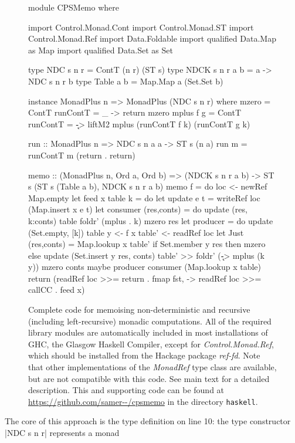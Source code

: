 \documentclass[a4paper,10pt]{article}
\begin{document}
\begin{figure}
\begin{haskell}
  module CPSMemo where

  import Control.Monad.Cont
  import Control.Monad.ST
  import Control.Monad.Ref
  import Data.Foldable
  import qualified Data.Map as Map
  import qualified Data.Set as Set

  type NDC s n r = ContT (n r) (ST s)
  type NDCK s n r a b = a -> NDC s n r b
  type Table a b = Map.Map a (Set.Set b)

  instance MonadPlus n => MonadPlus (NDC s n r) where
    mzero = ContT {runContT = \_ -> return mzero}
    mplus f g = ContT {runContT = \k -> liftM2 mplus (runContT f k) (runContT g k)}

  run :: MonadPlus n => NDC s n a a -> ST s (n a)
  run m = runContT m (return . return)

  memo :: (MonadPlus n, Ord a, Ord b) => 
           (NDCK s n r a b) -> ST s (ST s (Table a b), NDCK s n r a b)
  memo f = do
    loc <- newRef Map.empty
    let feed x table k = do
        let update e t = writeRef loc (Map.insert x e t)
        let consumer (res,conts) = do
            update (res, k:conts) table
            foldr' (mplus . k) mzero res
        let producer = do
            update (Set.empty, [k]) table
            y <- f x
            table' <- readRef loc
            let Just (res,conts) = Map.lookup x table'
            if Set.member y res then mzero
            else update (Set.insert y res, conts) table' >>
                 foldr' (\k -> mplus (k y)) mzero conts
        maybe producer consumer (Map.lookup x table)
    return (readRef loc >>= return . fmap fst,
            \x -> readRef loc >>= callCC . feed x)
\end{haskell}
\caption{Complete code for memoising non-deterministic and recursive (including left-recursive) monadic
computations.
All of the required library modules are automatically included in most installations of GHC, the Glasgow Haskell
Compiler, except for \emph{Control.Monad.Ref}, which should be installed from the Hackage package \emph{ref-fd}. Note
that other implementations of the \emph{MonadRef} type class are available, but are not compatible with this code.
See main text for a detailed description. This and supporting code can be found at \url{https://github.com/samer--/cpsmemo}
in the directory \texttt{haskell}.
}
\end{figure}
The core of this approach is the type definition on line 10: the type constructor |NDC s n r| represents a monad
\end{document}
